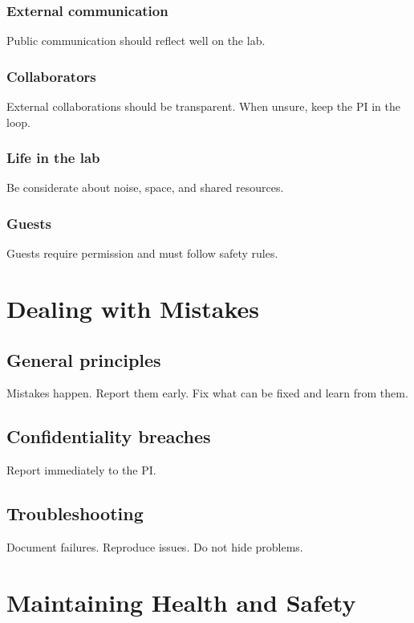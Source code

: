 \documentclass[11pt]{article}
\begin{document}
\subsubsection{External communication}
Public communication should reflect well on the lab.

\subsubsection{Collaborators}
External collaborations should be transparent.
When unsure, keep the PI in the loop.





\subsubsection{Life in the lab}
Be considerate about noise, space, and shared resources.

\subsubsection{Guests}
Guests require permission and must follow safety rules.

\section{Dealing with Mistakes}

\subsection{General principles}
Mistakes happen.
Report them early.
Fix what can be fixed and learn from them.

\subsection{Confidentiality breaches}
Report immediately to the PI.

\subsection{Troubleshooting}
Document failures.
Reproduce issues.
Do not hide problems.

\section{Maintaining Health and Safety}
\end{document}
